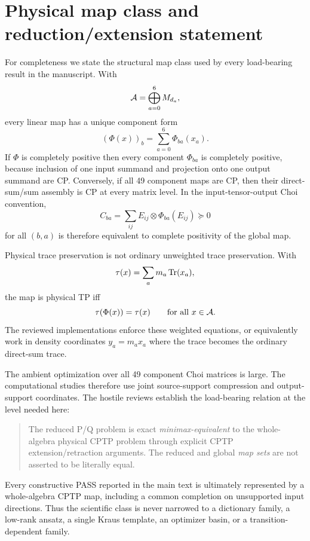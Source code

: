 \section{Physical map class and reduction/extension statement}
\label{app:map-class}

For completeness we state the structural map class used by every load-bearing result in the manuscript.  With
\begin{equation}
\mathcal A=\bigoplus_{a=0}^{6}M_{d_a},
\end{equation}
every linear map has a unique component form
\begin{equation}
(\Phi(x))_b=\sum_{a=0}^{6}\Phi_{ba}(x_a).
\end{equation}
If $\Phi$ is completely positive then every component $\Phi_{ba}$ is completely positive, because inclusion of one input summand and projection onto one output summand are CP.  Conversely, if all 49 component maps are CP, then their direct-sum/sum assembly is CP at every matrix level.  In the input-tensor-output Choi convention,
\begin{equation}
C_{ba}=\sum_{ij}E_{ij}\otimes\Phi_{ba}(E_{ij})\succeq0
\end{equation}
for all $(b,a)$ is therefore equivalent to complete positivity of the global map.

Physical trace preservation is not ordinary unweighted trace preservation.  With
\begin{equation}
\tau(x)=\sum_a m_a\operatorname{Tr}(x_a),
\end{equation}
the map is physical TP iff
\begin{equation}
\tau(\Phi(x))=\tau(x)
\qquad\text{for all }x\in\mathcal A.
\end{equation}
The reviewed implementations enforce these weighted equations, or equivalently work in density coordinates $y_a=m_ax_a$ where the trace becomes the ordinary direct-sum trace.

The ambient optimization over all 49 component Choi matrices is large.  The computational studies therefore use joint source-support compression and output-support coordinates.  The hostile reviews establish the load-bearing relation at the level needed here:

\begin{quote}
The reduced P/Q problem is exact \emph{minimax-equivalent} to the whole-algebra physical CPTP problem through explicit CPTP extension/retraction arguments.  The reduced and global \emph{map sets} are not asserted to be literally equal.
\end{quote}

Every constructive PASS reported in the main text is ultimately represented by a whole-algebra CPTP map, including a common completion on unsupported input directions.  Thus the scientific class is never narrowed to a dictionary family, a low-rank ansatz, a single Kraus template, an optimizer basin, or a transition-dependent family.
